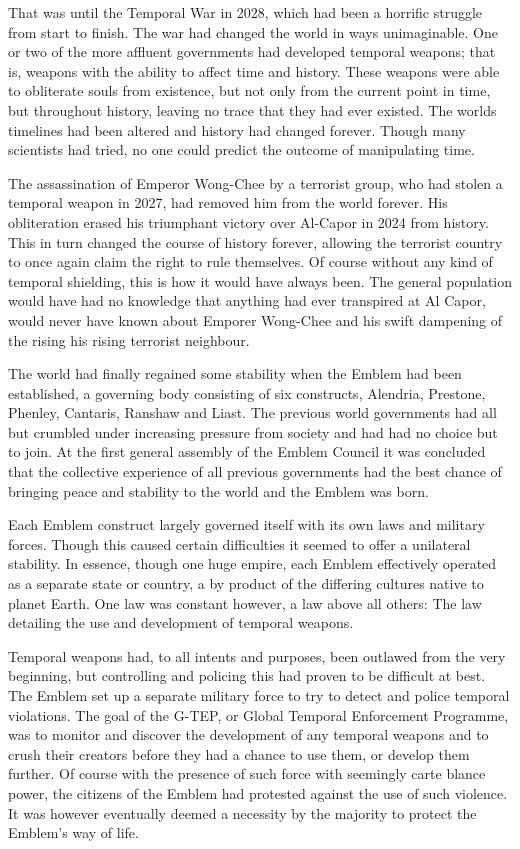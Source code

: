 That was until the Temporal War in 2028, which had been a horrific struggle from start to finish. The war had changed the world in ways unimaginable. One or two of the more affluent governments had developed temporal weapons; that is, weapons with the ability to affect time and history. These weapons were able to obliterate souls from existence, but not only from the current point in time, but throughout history, leaving no trace that they had ever existed. The worlds timelines had been altered and history had changed forever. Though many scientists had tried, no one could predict the outcome of manipulating time.

The assassination of Emperor Wong-Chee by a terrorist group, who had stolen a temporal weapon in 2027, had removed him from the world forever. His obliteration erased his triumphant victory over Al-Capor in 2024 from history. This in turn changed the course of history forever, allowing the terrorist country to once again claim the right to rule themselves. Of course without any kind of temporal shielding, this is how it would have always been. The general population would have had no knowledge that anything had ever transpired at Al Capor, would never have known about Emporer Wong-Chee and his swift dampening of the rising his rising terrorist neighbour.

The world had finally regained some stability when the Emblem had been established, a governing body consisting of six constructs, Alendria, Prestone, Phenley, Cantaris, Ranshaw and Liast. The previous world governments had all but crumbled under increasing pressure from society and had had no choice but to join. At the first general assembly of the Emblem Council it was concluded that the collective experience of all previous governments had the best chance of bringing peace and stability to the world and the Emblem was born.

Each Emblem construct largely governed itself with its own laws and military forces. Though this caused certain difficulties it seemed to offer a unilateral stability. In essence, though one huge empire, each Emblem effectively operated as a separate state or country, a by product of the differing cultures native to planet Earth. One law was constant however, a law above all others: The law detailing the use and development of temporal weapons.

Temporal weapons had, to all intents and purposes, been outlawed from the very beginning, but controlling and policing this had proven to be difficult at best. The Emblem set up a separate military force to try to detect and police temporal violations. The goal of the G-TEP, or Global Temporal Enforcement Programme, was to monitor and discover the development of any temporal weapons and to crush their creators before they had a chance to use them, or develop them further. Of course with the presence of such force with seemingly carte blance power, the citizens of the Emblem had protested against the use of such violence. It was however eventually deemed a necessity by the majority to protect the Emblem's way of life.

